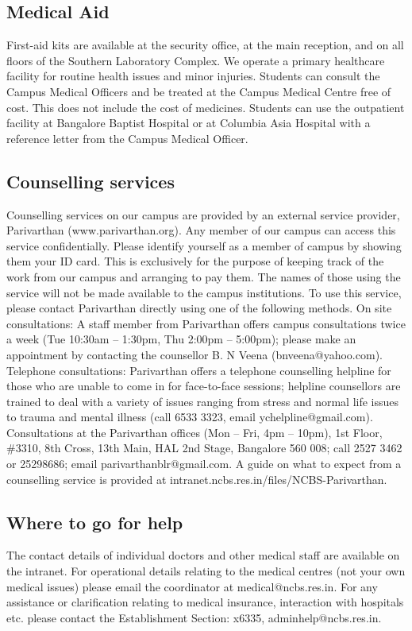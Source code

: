\documentclass[a4paper]{extarticle}
\begin{document}
\subsection{Medical Aid}
First-aid kits are available at the security office, at the main reception, and on
all floors of the Southern Laboratory Complex. We operate a primary healthcare facility for
routine health issues and minor injuries. Students can consult the Campus Medical Officers
and be treated at the Campus Medical Centre free of cost. This does not include the cost of
medicines. Students can use the outpatient facility at Bangalore Baptist Hospital or at
Columbia Asia Hospital with a reference letter from the Campus Medical Officer.

\subsection{Counselling services}
Counselling services on our campus are provided by an external
service provider, Parivarthan (www.parivarthan.org). Any member of our campus can
access this service confidentially. Please identify yourself as a member of campus by
showing them your ID card. This is exclusively for the purpose of keeping track of the work
from our campus and arranging to pay them. The names of those using the service will not
be made available to the campus institutions. To use this service, please contact Parivarthan
directly using one of the following methods. On site consultations: A staff member from
Parivarthan offers campus consultations twice a week (Tue 10:30am – 1:30pm, Thu 2:00pm
– 5:00pm); please make an appointment by contacting the counsellor B. N Veena
(bnveena@yahoo.com). Telephone consultations: Parivarthan offers a telephone counselling
helpline for those who are unable to come in for face-to-face sessions; helpline counsellors
are trained to deal with a variety of issues ranging from stress and normal life issues to
trauma and mental illness (call 6533 3323, email ychelpline@gmail.com). Consultations at
the Parivarthan offices (Mon – Fri, 4pm – 10pm), 1st Floor, \#3310, 8th Cross, 13th Main,
HAL 2nd Stage, Bangalore 560 008; call
2527 3462 or 25298686; email
parivarthanblr@gmail.com. A guide on what to expect from a counselling service is
provided at intranet.ncbs.res.in/files/NCBS-Parivarthan.

\subsection{Where to go for help}
The contact details of individual doctors and other medical staff are available on the
intranet. For operational details relating to the medical centres (not your own medical issues)
please email the coordinator at medical@ncbs.res.in. For any assistance or clarification
relating to medical insurance, interaction with hospitals etc. please contact the Establishment
Section: x6335, adminhelp@ncbs.res.in.
\end{document}
